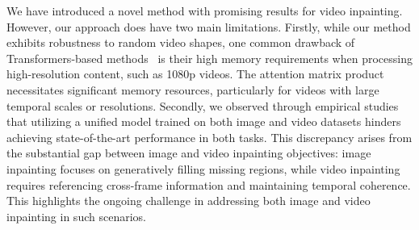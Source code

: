 \documentclass[10pt,twocolumn,letterpaper]{article}
\begin{document}
We have introduced a novel method with promising results for video inpainting. However, our approach does have two main limitations.
Firstly, while our method exhibits robustness to random video shapes, one common drawback of Transformers-based methods~\cite{liu21fuseformer,zeng20sttn,li22e2fgvi} is their high memory requirements when processing high-resolution content, such as 1080p videos. The attention matrix product necessitates significant memory resources, particularly for videos with large temporal scales or resolutions.
Secondly, we observed through empirical studies that utilizing a unified model trained on both image and video datasets hinders achieving state-of-the-art performance in both tasks. This discrepancy arises from the substantial gap between image and video inpainting objectives: image inpainting focuses on generatively filling missing regions, while video inpainting requires referencing cross-frame information and maintaining temporal coherence. This highlights the ongoing challenge in addressing both image and video inpainting in such scenarios.
\end{document}
